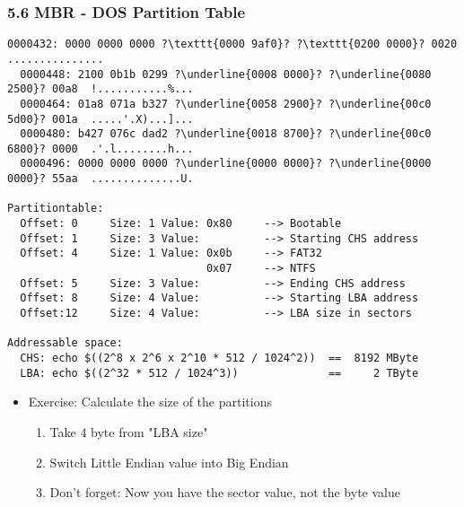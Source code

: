 \begin{frame}[fragile]
  \frametitle{5.6 MBR - DOS Partition Table}
  \begin{lstlisting}[basicstyle=\tiny,escapechar=\?]
  0000432: 0000 0000 0000 ?\texttt{0000 9af0}? ?\texttt{0200 0000}? 0020  ............... 
  0000448: 2100 0b1b 0299 ?\underline{0008 0000}? ?\underline{0080 2500}? 00a8  !...........%...
  0000464: 01a8 071a b327 ?\underline{0058 2900}? ?\underline{00c0 5d00}? 001a  .....'.X)...]...
  0000480: b427 076c dad2 ?\underline{0018 8700}? ?\underline{00c0 6800}? 0000  .'.l........h...
  0000496: 0000 0000 0000 ?\underline{0000 0000}? ?\underline{0000 0000}? 55aa  ..............U.

Partitiontable:
  Offset: 0     Size: 1	Value: 0x80     --> Bootable
  Offset: 1     Size: 3	Value:          --> Starting CHS address
  Offset: 4     Size: 1	Value: 0x0b     --> FAT32
                               0x07     --> NTFS
  Offset: 5     Size: 3	Value:          --> Ending CHS address
  Offset: 8     Size: 4 Value:          --> Starting LBA address
  Offset:12     Size: 4 Value:          --> LBA size in sectors
  
Addressable space:
  CHS: echo $((2^8 x 2^6 x 2^10 * 512 / 1024^2))  ==  8192 MByte
  LBA: echo $((2^32 * 512 / 1024^3))              ==     2 TByte
  \end{lstlisting}
    \begin{itemize}
	    \item[] Exercise: Calculate the size of the partitions
        \begin{enumerate}
            \item Take 4 byte from "LBA size"
	    \item Switch Little Endian value into Big Endian
	    \item Don't forget: Now you have the sector value, not the byte value
        \end{enumerate}
    \end{itemize}
\end{frame}


